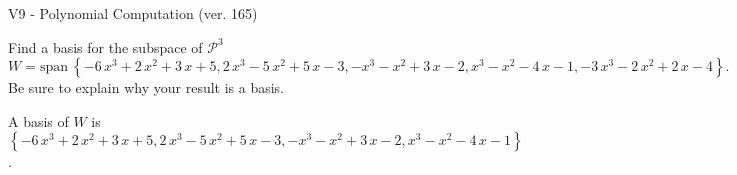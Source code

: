 \begin{exercise}
  \begin{exerciseTitle}V9 - Polynomial Computation (ver. 165)\end{exerciseTitle}
  \begin{exerciseStatement}
    Find a basis for the subspace of \(\mathcal{P}^3\) 
\[W=\mathrm{span}\ \left\{-6 \, x^{3} + 2 \, x^{2} + 3 \, x + 5 , 2 \, x^{3} - 5 \, x^{2} + 5 \, x - 3 , -x^{3} - x^{2} + 3 \, x - 2 , x^{3} - x^{2} - 4 \, x - 1 , -3 \, x^{3} - 2 \, x^{2} + 2 \, x - 4\right\}.\]
 Be sure to explain why your result is a basis.


  \end{exerciseStatement}
  \begin{exerciseAnswer}
   A basis of \(W\) is  \(\left\{-6 \, x^{3} + 2 \, x^{2} + 3 \, x + 5 , 2 \, x^{3} - 5 \, x^{2} + 5 \, x - 3 , -x^{3} - x^{2} + 3 \, x - 2 , x^{3} - x^{2} - 4 \, x - 1\right\}\).
  


  \end{exerciseAnswer}
\end{exercise}